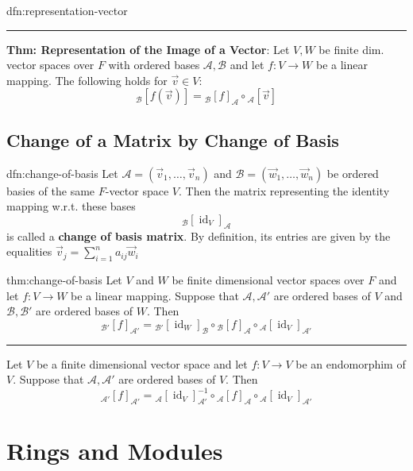 \documentclass[landscape, 8pt]{extarticle}
\DeclareMathOperator{\id}{id}
\begin{document}
\begin{multicols}{3}
\begin{dfn}{dfn:representation-vector}{}
    \noindent\rule{\textwidth}{0.2pt}
    \textbf{Thm: Representation of the Image of a Vector}: Let $V,W$ be finite dim. vector spaces over $F$ with ordered bases $\mathcal{A}, \mathcal{B}$ and let $f : V \to W$ be a linear mapping. The following holds for $\vec{v}\in V$:
    \[{}_{\mathcal{B}}[f(\vec{v})] = {}_{\mathcal{B}}[f]_{\mathcal{A}}\circ {}_{\mathcal{A}}[\vec{v}]\]
\end{dfn}

\subsection{Change of a Matrix by Change of Basis}

\begin{dfn}{dfn:change-of-basis}{}
    Let $\mathcal{A} = (\vec{v}_{1},\dots,\vec{v}_{n})$ and $\mathcal{B} = (\vec{w}_{1},\dots,\vec{w}_{n})$ be ordered basies of the same $F$-vector space $V$. Then the matrix representing the identity mapping w.r.t. these bases
    \[{}_{\mathcal{B}}[\id_{V}]_{\mathcal{A}}\]
    is called a \textbf{change of basis matrix}. By definition, its entries are given by the equalities $\vec{v}_{j} = \sum_{i = 1}^{n} a_{ij}\vec{w}_{i}$
\end{dfn}

\begin{thm}{thm:change-of-basis}{}
    Let $V$ and $W$ be finite dimensional vector spaces over $F$ and let $f : V \to W$ be a linear mapping. Suppose that $\mathcal{A}, \mathcal{A}'$ are ordered bases of $V$ and $\mathcal{B}, \mathcal{B}'$ are ordered bases of $W$. Then
    \[{}_{\mathcal{B}'}[f]_{\mathcal{A}'} = {}_{\mathcal{B}'}[\id_{W}]_{\mathcal{B}} \circ {}_{\mathcal{B}}[f]_{\mathcal{A}} \circ {}_{\mathcal{A}}[\id_{V}]_{\mathcal{A}'}\]

    \noindent\rule{\textwidth}{0.2pt}
    Let $V$ be a finite dimensional vector space and let $f : V \to V$ be an endomorphim of $V$. Suppose that $\mathcal{A}, \mathcal{A}'$ are ordered bases of $V$. Then
    \[{}_{\mathcal{A}'}[f]_{\mathcal{A}'} = {}_{\mathcal{A}}[\id_{V}]_{\mathcal{A}'}^{-1} \circ {}_{\mathcal{A}}[f]_{\mathcal{A}} \circ {}_{\mathcal{A}}[\id_{V}]_{\mathcal{A}'}\]
\end{thm}


\section{Rings and Modules}


\end{multicols}
\end{document}
